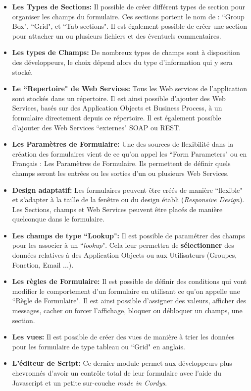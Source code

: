 \begin{itemize}\itemsep5pt
	\item \textbf{Les Types de Sections: }Il possible de créer différent types de section pour organiser les champs du formulaire. Ces sections portent le nom de : ``Group Box", ``Grid", et  ``Tab sections". Il est également possible de créer une section pour attacher un ou plusieurs fichiers et des éventuels commentaires.
		
	\item \textbf{Les types de Champs: }De nombreux types de champs sont à disposition des développeurs, le choix dépend alors du type d'information qui y sera stocké.
	
	\item \textbf{Le ``Repertoire" de Web Services: }Tous les Web services de l'application sont stockés dans un répertoire. Il est ainsi possible d'ajouter des Web Services, basés sur des Application Objects et Business Process, à un formulaire directement depuis ce répertoire. Il est également possible d'ajouter des Web Services ``externes" SOAP ou REST.
	
	\item \textbf{Les Paramètres de Formulaire: }Une des sources de flexibilité dans la création des formulaires vient de ce qu'on appel les ``Form Parameters" ou en Français : Les Paramètres de Formulaire. Ils permettent de définir quels champs seront les entrées ou les sorties d'un ou plusieurs Web Services.
	
	\item \textbf{Design adaptatif: }Les formulaires peuvent être créés de manière ``flexible" et s'adapter à la taille de la fenêtre ou du design établi (\textit{Responsive Design}). Les Sections, champs et Web Services peuvent être placés de manière quelconque dans le formulaire.
			
	\item \textbf{Les champs de type ``Lookup": }Il est possible de paramétrer des champs pour les associer à un ``\emph{lookup}". Cela leur permettra de \textbf{sélectionner} des données relatives à des Application Objects ou aux Utilisateurs (Groupes, Fonction, Email  ...).

	\item \textbf{Les règles de Formulaire: }Il est possible de définir des conditions qui vont modifier le comportement d'un formulaire en utilisant ce qu'on appelle une ``Règle de Formulaire". Il est ainsi possible d'assigner des valeurs, afficher des messages, cacher ou forcer l'affichage, bloquer ou débloquer un champs, une section.
	
	\item \textbf{Les vues: }Il est possible de créer des vues de manière à trier les données pour les formulaire de type tableau ou ``Grid" en anglais.
	
	\item \textbf{L'éditeur de Script: }Ce dernier module permet aux développeurs plus chevronnés d'avoir un contrôle total de leur formulaire avec l'aide du Javascript et un petite sur-couche \textit{made in Cordys}.

\end{itemize}

